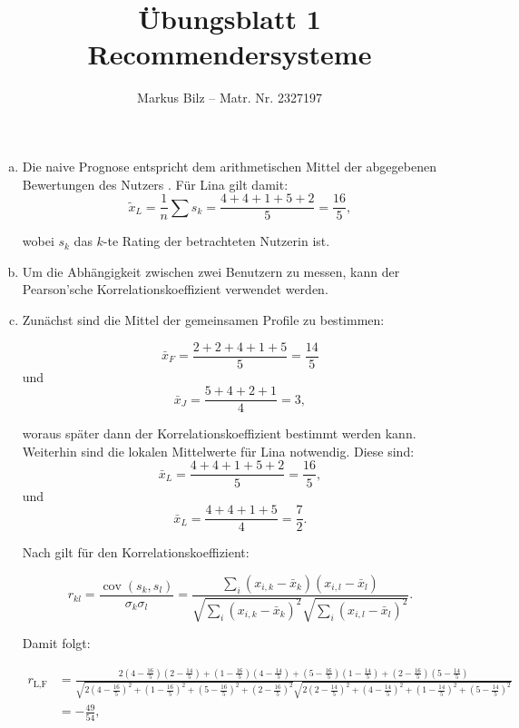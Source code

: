 \documentclass{article}
\begin{document}
\author{Markus Bilz -- Matr. Nr. 2327197}
\title{Übungsblatt 1 Recommendersysteme}
\maketitle

\begin{enumerate}[a.]
\item Die naive Prognose entspricht dem arithmetischen Mittel der abgegebenen Bewertungen des Nutzers \autocite{geyer-schulz_sonnenbichler_2019}. Für Lina gilt damit: 
$$\tilde{x}_{L}=\frac{1}{n} \sum s_{k}=\frac{4+4+1+5+2}{5}=\frac{16}{5},
$$ 

wobei $s_k$ das $k$-te Rating der betrachteten Nutzerin ist.

\item Um die Abhängigkeit zwischen zwei Benutzern zu messen, kann der Pearson'sche Korrelationskoeffizient verwendet werden.

\item Zunächst sind die Mittel der gemeinsamen Profile zu bestimmen:

$$\bar{x}_{F} =\frac{2+2+4+1+5}{5}=\frac{14}{5}$$ 
und
$$\bar{x}_{J}= \frac{5+4+2+1}{4}=3,$$ 

woraus später dann der Korrelationskoeffizient bestimmt werden kann. Weiterhin sind die lokalen Mittelwerte für Lina notwendig. Diese sind:
$$\bar{x}_{L}=\frac{4+4+1+5+2}{5}=\frac{16}{5},
$$ 
und
$$\bar{x}_{L}=\frac{4+4+1+5}{4}=\frac{7}{2}.
$$ 

Nach \textcite{geyer-schulz_sonnenbichler_2019} gilt für den Korrelationskoeffizient: 

$$
r_{k l}=\frac{\operatorname{cov}\left(s_{k}, s_{l}\right)}{\sigma_{k} \sigma_{l}}=\frac{\sum_{i}\left(x_{i, k}-\bar{x}_{k}\right)\left(x_{i, l}-\bar{x}_{l}\right)}{\sqrt{\sum_{i}\left(x_{i, k}-\bar{x}_{k}\right)^{2}} \sqrt{\sum_{i}\left(x_{i, l}-\bar{x}_{l}\right)^{2}}}.
$$

Damit folgt:

\begin{equation*}
\begin{split}
r_{\text {L}, \text {F}} &=\frac{2\left(4-\frac{16}{5}\right)\left(2-\frac{14}{5}\right)+\left(1-\frac{16}{5}\right)\left(4-\frac{14}{5}\right)+\left(5-\frac{16}{5}\right)\left(1-\frac{14}{5}\right)+\left(2-\frac{16}{5}\right)\left(5-\frac{14}{5}\right)}{\sqrt{2\left(4-\frac{16}{5}\right)^{2}+\left(1-\frac{16}{5}\right)^{2}+\left(5-\frac{16}{5}\right)^{2}+\left(2-\frac{16}{5}\right)^{2}} \sqrt{2\left(2-\frac{14}{5}\right)^{2}+\left(4-\frac{14}{5}\right)^{2}+\left(1-\frac{14}{5}\right)^{2}+\left(5-\frac{14}{5}\right)^{2}}}\\
&=-\frac{49}{54},
\end{split}
\end{equation*}


\end{enumerate}
\end{document}
